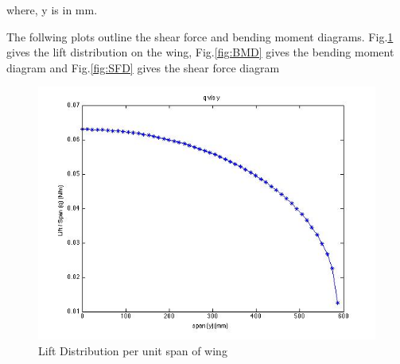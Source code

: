 where, y is in mm.

The follwing plots outline the shear force and bending moment diagrams. Fig.\ref{fig:liftdist} gives the lift distribution on the wing, Fig.\ref{fig:BMD} gives the bending moment diagram and Fig.\ref{fig:SFD} gives the shear force diagram
\begin{figure}[H]
    \begin{center}
      \includegraphics[width=5.1in]{figures/qy.jpg}
\caption{Lift Distribution per unit span of wing}
       \label{fig:liftdist}
    \end{center}
\end{figure}

